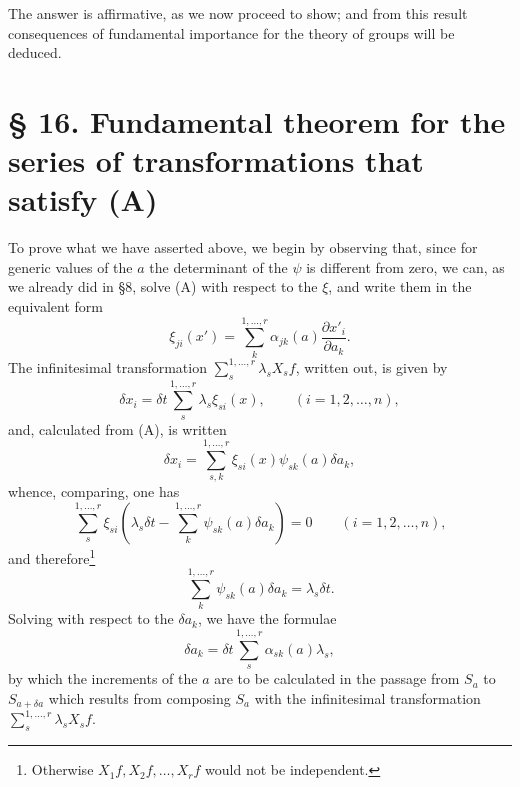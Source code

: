 \documentclass[11pt]{book}
\begin{document}
The answer is affirmative, as we now proceed to show; and from this result consequences of fundamental importance for the theory of groups will be deduced.

\section*{\S{} 16. Fundamental theorem for the series of transformations that satisfy (A)}

To prove what we have asserted above, we begin by observing that, since for generic values of the $a$ the determinant of the $\psi$ is different from zero, we can, as we already did in \S{}8, solve (A) with respect to the $\xi$, and write them in the equivalent form
\begin{equation*}\tag{B}
 \xi_{ji}(x')=\sum\limits_k^{1,\ldots,r}\alpha_{jk}(a)\frac{\partial x'_i}{\partial a_k}.
\end{equation*}
The infinitesimal transformation $\sum\limits_s^{1,\ldots,r}\lambda_sX_sf$, written out, is given by
\[
 \delta x_i=\delta t\sum\limits_s^{1,\ldots,r}\lambda_s\xi_{si}(x),\qquad (i=1,2,\ldots,n),
\]
and, calculated from (A), is written
\[
 \delta x_i=\sum\limits_{s,k}^{1,\ldots,r}\xi_{si}(x)\psi_{sk}(a)\delta a_k,
\]
whence, comparing, one has
\[
 \sum\limits_s^{1,\ldots,r}\xi_{si}\left(\lambda_s\delta t-\sum\limits_k^{1,\ldots,r}\psi_{sk}(a)\delta a_k\right)=0
 \qquad(i=1,2,\ldots,n),
\]
and therefore\footnote{Otherwise $X_1f,X_2f,\ldots,X_rf$ would not be independent.}
\[
 \sum\limits_k^{1,\ldots,r}\psi_{sk}(a)\delta a_k=\lambda_s\delta t.
\]
Solving with respect to the $\delta a_k$, we have the formulae
\begin{equation*}\tag{c}
 \delta a_k=\delta t\sum\limits_s^{1,\ldots,r}\alpha_{sk}(a)\lambda_s,
\end{equation*}
by which the increments of the $a$ are to be calculated in the passage from $S_a$ to $S_{a+\delta a}$ which results from composing $S_a$ with the infinitesimal transformation $\sum\limits_s^{1,\ldots,r}\lambda_sX_sf$.
\end{document}
